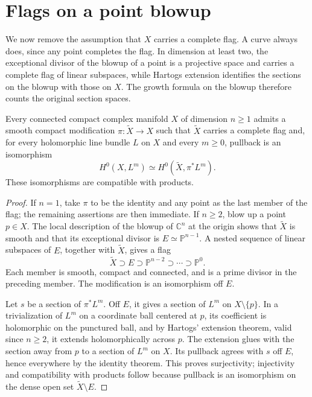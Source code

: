 \section{Flags on a point blowup}
\label{sec:auxiliary-blowup-flag}

We now remove the assumption that $X$ carries a complete flag. A curve always does, since any point completes the flag. In dimension at least two, the exceptional divisor of the blowup of a point is a projective space and carries a complete flag of linear subspaces, while Hartogs extension identifies the sections on the blowup with those on $X$. The growth formula on the blowup therefore counts the original section spaces.

\begin{lemma}\label{lem:point-blowup-section-descent}
Every connected compact complex manifold $X$ of dimension $n\geq1$ admits a smooth compact modification $\pi\colon\widetilde X\to X$ such that $\widetilde X$ carries a complete flag and, for every holomorphic line bundle $L$ on $X$ and every $m\geq0$, pullback is an isomorphism
\[
 H^0(X,L^m)\simeq H^0(\widetilde X,\pi^*L^m).
\]
These isomorphisms are compatible with products.
\end{lemma}
\begin{proof}
If $n=1$, take $\pi$ to be the identity and any point as the last member of the flag; the remaining assertions are then immediate. If $n\geq2$, blow up a point $p\in X$. The local description of the blowup of $\mathbb C^n$ at the origin shows that $\widetilde X$ is smooth and that its exceptional divisor is $E\simeq\mathbb P^{n-1}$. A nested sequence of linear subspaces of $E$, together with $\widetilde X$, gives a flag
\[
 \widetilde X\supset E\supset\mathbb P^{n-2}
       \supset\cdots\supset\mathbb P^0.
\]
Each member is smooth, compact and connected, and is a prime divisor in the preceding member. The modification is an isomorphism off $E$.

Let $s$ be a section of $\pi^*L^m$. Off $E$, it gives a section of $L^m$ on $X\setminus\{p\}$. In a trivialization of $L^m$ on a coordinate ball centered at $p$, its coefficient is holomorphic on the punctured ball, and by Hartogs' extension theorem, valid since $n\geq2$, it extends holomorphically across $p$. The extension glues with the section away from $p$ to a section of $L^m$ on $X$. Its pullback agrees with $s$ off $E$, hence everywhere by the identity theorem. This proves surjectivity; injectivity and compatibility with products follow because pullback is an isomorphism on the dense open set $\widetilde X\setminus E$.
\end{proof}

